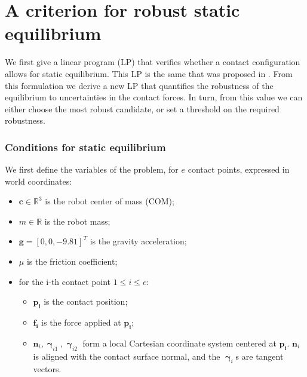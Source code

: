 
\section{A criterion for robust static equilibrium}
\label{sec:Equil}

We first give a linear program (LP) that verifies whether a contact configuration allows for static equilibrium. This LP is the same that was proposed in  \citep{Prete2016}.
From this formulation we derive a new LP that quantifies the robustness of the equilibrium to uncertainties in the contact forces.
In turn, from this value we can either choose the most robust candidate, or set a threshold on the required robustness. 


\subsubsection{Conditions for static equilibrium}
We first define the variables of the problem, for $e$ contact points, expressed in world coordinates:
\begin{itemize}
\item $\mathbf{c} \in \mathbb{R}^3$ is the robot center of mass (COM);
\item $m \in \mathbb{R}$ is the robot mass;
\item $\mathbf{g} = [0,0,-9.81]^T$ is the gravity acceleration;
\item $\mu$ is the friction coefficient;
\item for the i-th contact point $1 \leq i \leq e$:
	\begin{itemize}
	\item $\mathbf{p_i}$ is the contact position;
	\item $\mathbf{f_i}$ is the force applied at $\mathbf{p_i}$;
	\item $\mathbf{n}_i,\mathbf{\boldsymbol\upgamma}_{i1},\mathbf{\boldsymbol\upgamma}_{i2}$ form a local Cartesian coordinate system centered at $\mathbf{p_i}$. $\mathbf{n}_i$ is aligned
	with the contact surface normal, and the $\mathbf{\boldsymbol\upgamma}_i$s are tangent vectors.
	\end{itemize}
\end{itemize}

